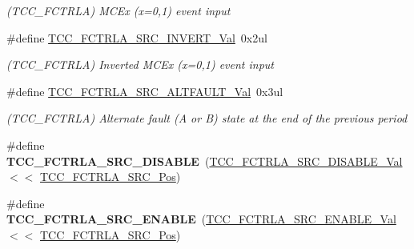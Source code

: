 \begin{DoxyCompactItemize}
\begin{DoxyCompactList}\small\item\em (T\+C\+C\+\_\+\+F\+C\+T\+R\+L\+A) M\+C\+Ex (x=0,1) event input \end{DoxyCompactList}\item 
\hypertarget{group___s_a_m_l21___t_c_c_ga8d29df4e62b3e4280e08626c9119bd7b}{}\#define \hyperlink{group___s_a_m_l21___t_c_c_ga8d29df4e62b3e4280e08626c9119bd7b}{T\+C\+C\+\_\+\+F\+C\+T\+R\+L\+A\+\_\+\+S\+R\+C\+\_\+\+I\+N\+V\+E\+R\+T\+\_\+\+Val}~0x2ul\label{group___s_a_m_l21___t_c_c_ga8d29df4e62b3e4280e08626c9119bd7b}

\begin{DoxyCompactList}\small\item\em (T\+C\+C\+\_\+\+F\+C\+T\+R\+L\+A) Inverted M\+C\+Ex (x=0,1) event input \end{DoxyCompactList}\item 
\hypertarget{group___s_a_m_l21___t_c_c_ga7ab0b9cdeb48ae88c9b1390c9714aa1a}{}\#define \hyperlink{group___s_a_m_l21___t_c_c_ga7ab0b9cdeb48ae88c9b1390c9714aa1a}{T\+C\+C\+\_\+\+F\+C\+T\+R\+L\+A\+\_\+\+S\+R\+C\+\_\+\+A\+L\+T\+F\+A\+U\+L\+T\+\_\+\+Val}~0x3ul\label{group___s_a_m_l21___t_c_c_ga7ab0b9cdeb48ae88c9b1390c9714aa1a}

\begin{DoxyCompactList}\small\item\em (T\+C\+C\+\_\+\+F\+C\+T\+R\+L\+A) Alternate fault (A or B) state at the end of the previous period \end{DoxyCompactList}\item 
\hypertarget{group___s_a_m_l21___t_c_c_ga59a04aac6aaabd58df2ef9d11b0df655}{}\#define {\bfseries T\+C\+C\+\_\+\+F\+C\+T\+R\+L\+A\+\_\+\+S\+R\+C\+\_\+\+D\+I\+S\+A\+B\+L\+E}~(\hyperlink{group___s_a_m_l21___t_c_c_ga637d8bf25f0c4aed04b57684d4c00311}{T\+C\+C\+\_\+\+F\+C\+T\+R\+L\+A\+\_\+\+S\+R\+C\+\_\+\+D\+I\+S\+A\+B\+L\+E\+\_\+\+Val}    $<$$<$ \hyperlink{group___s_a_m_l21___t_c_c_ga402acbd670b494207ddf863d2b4235e3}{T\+C\+C\+\_\+\+F\+C\+T\+R\+L\+A\+\_\+\+S\+R\+C\+\_\+\+Pos})\label{group___s_a_m_l21___t_c_c_ga59a04aac6aaabd58df2ef9d11b0df655}

\item 
\hypertarget{group___s_a_m_l21___t_c_c_ga378b1b9f5ee51a9c1c052e0a2b78b1be}{}\#define {\bfseries T\+C\+C\+\_\+\+F\+C\+T\+R\+L\+A\+\_\+\+S\+R\+C\+\_\+\+E\+N\+A\+B\+L\+E}~(\hyperlink{group___s_a_m_l21___t_c_c_gada46b94ac2cebcd63adfb378f164d6ca}{T\+C\+C\+\_\+\+F\+C\+T\+R\+L\+A\+\_\+\+S\+R\+C\+\_\+\+E\+N\+A\+B\+L\+E\+\_\+\+Val}     $<$$<$ \hyperlink{group___s_a_m_l21___t_c_c_ga402acbd670b494207ddf863d2b4235e3}{T\+C\+C\+\_\+\+F\+C\+T\+R\+L\+A\+\_\+\+S\+R\+C\+\_\+\+Pos})\label{group___s_a_m_l21___t_c_c_ga378b1b9f5ee51a9c1c052e0a2b78b1be}


\end{DoxyCompactItemize}
